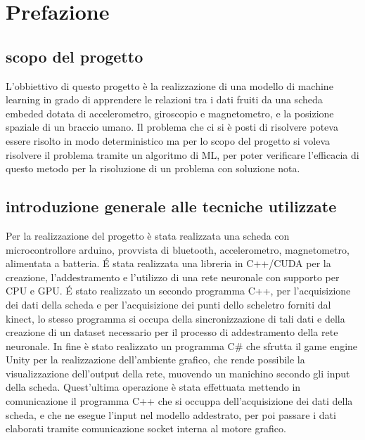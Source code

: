 \documentclass[10pt,a4paper]{article}
\begin{document}
 
\section{Prefazione}
 
\subsection{scopo del progetto}
L'obbiettivo di questo progetto \`e la realizzazione di una modello di machine learning in grado di apprendere le relazioni tra i dati fruiti da una scheda embeded dotata di accelerometro, giroscopio e magnetometro, e la posizione spaziale di un braccio umano.
Il problema che ci si \`e posti di risolvere poteva essere risolto in modo deterministico ma per lo scopo del progetto si voleva risolvere il problema tramite un algoritmo di ML, per poter verificare l'efficacia di questo metodo per la risoluzione di un problema con soluzione nota.


\subsection{introduzione generale alle tecniche utilizzate}
Per la realizzazione del progetto è stata realizzata una scheda con microcontrollore arduino, provvista di bluetooth, accelerometro, magnetometro, alimentata a batteria.
\'E stata realizzata una libreria in C++/CUDA per la creazione, l'addestramento e l'utilizzo di una rete neuronale con supporto per CPU e GPU.
\'E stato realizzato un secondo programma C++, per l'acquisizione dei dati della scheda e per l'acquisizione dei punti dello scheletro forniti dal kinect, lo stesso programma si occupa della sincronizzazione di tali dati e della creazione di un dataset necessario per il processo di addestramento della rete neuronale.
In fine è stato realizzato un programma C\# che sfrutta il game engine Unity per la realizzazione dell'ambiente grafico, che rende possibile la visualizzazione dell'output della rete, muovendo un manichino secondo gli input della scheda.
Quest'ultima operazione è stata effettuata mettendo in comunicazione il programma C++ che si occuppa dell'acquisizione dei dati della scheda, e che ne esegue l'input nel modello addestrato, per poi passare i dati elaborati tramite comunicazione socket interna al motore grafico.       
\end{document}
